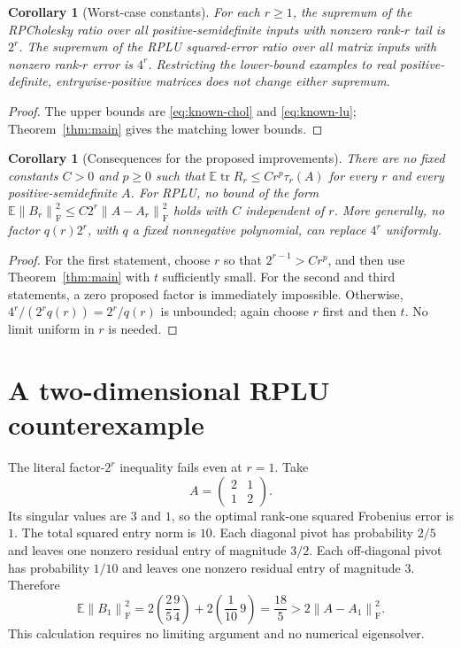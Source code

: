 \documentclass[11pt]{article}
\newtheorem{corollary}[theorem]{Corollary}
\theoremstyle{remark}
\DeclareMathOperator{\tr}{tr}
\newcommand{\E}{\mathbb E}
\newcommand{\F}{\mathrm F}
\newcommand{\norm}[1]{\left\lVert#1\right\rVert}
\begin{document}
\begin{corollary}[Worst-case constants]\label{cor:sup}
For each $r\ge1$, the supremum of the RPCholesky ratio over all
positive-semidefinite inputs with nonzero rank-$r$ tail is $2^r$. The supremum
of the RPLU squared-error ratio over all matrix inputs with nonzero rank-$r$
error is $4^r$. Restricting the lower-bound examples to real positive-definite,
entrywise-positive matrices does not change either supremum.
\end{corollary}
\begin{proof}
The upper bounds are \eqref{eq:known-chol} and \eqref{eq:known-lu};
Theorem~\ref{thm:main} gives the matching lower bounds.
\end{proof}

\begin{corollary}[Consequences for the proposed improvements]\label{cor:negative}
There are no fixed constants $C>0$ and $p\ge0$ such that
$\E\tr R_r\le Cr^p\tau_r(A)$ for every $r$ and every positive-semidefinite $A$.
For RPLU, no bound of the form
$\E\norm{B_r}_{\F}^2\le C2^r\norm{A-A_r}_{\F}^2$ holds with $C$ independent
of $r$. More generally, no factor $q(r)2^r$, with $q$ a fixed nonnegative polynomial,
can replace $4^r$ uniformly.
\end{corollary}
\begin{proof}
For the first statement, choose $r$ so that $2^{r-1}>Cr^p$, and then use
Theorem~\ref{thm:main} with $t$ sufficiently small. For the second and third
statements, a zero proposed factor is immediately impossible. Otherwise,
$4^r/(2^r q(r))=2^r/q(r)$ is unbounded; again choose $r$ first and then $t$.
No limit uniform in $r$ is needed.
\end{proof}

\section{A two-dimensional RPLU counterexample}

The literal factor-$2^r$ inequality fails even at $r=1$. Take
\begin{equation}\label{eq:small}
 A=\begin{pmatrix}2&1\\1&2\end{pmatrix}.
\end{equation}
Its singular values are $3$ and $1$, so the optimal rank-one squared Frobenius
error is $1$. The total squared entry norm is $10$. Each diagonal pivot has
probability $2/5$ and leaves one nonzero residual entry of magnitude $3/2$.
Each off-diagonal pivot has probability $1/10$ and leaves one nonzero residual
entry of magnitude $3$. Therefore
\begin{equation}\label{eq:small-expectation}
 \E\norm{B_1}_{\F}^2
 =2\left(\frac25\frac94\right)
  +2\left(\frac1{10}\,9\right)
 =\frac{18}{5}>2\norm{A-A_1}_{\F}^2.
\end{equation}
This calculation requires no limiting argument and no numerical eigensolver.
\end{document}

